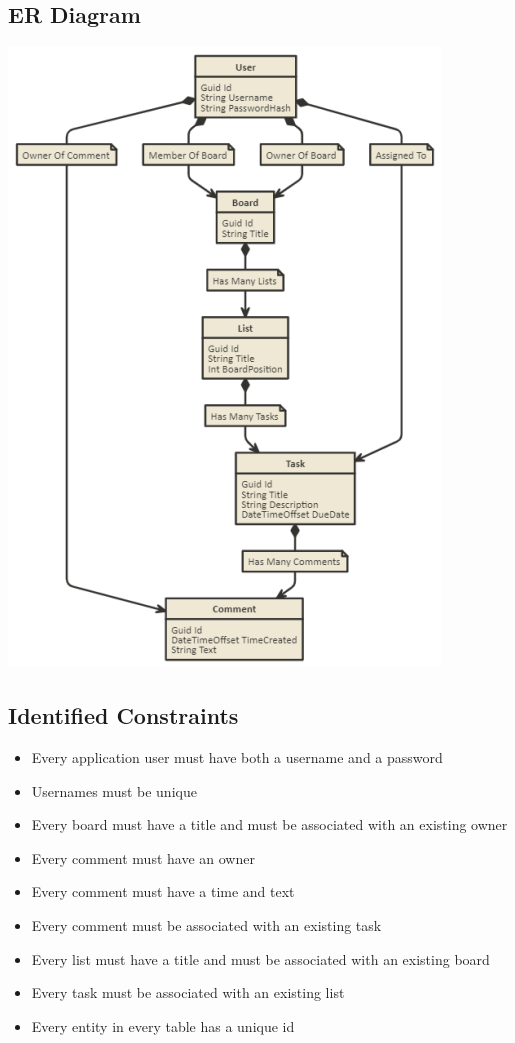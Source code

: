 \documentclass[letterpaper]{article}
\begin{document}
\subsection{ER Diagram}
\includegraphics[scale=0.75]{Images/ER}
\pagebreak

\subsection{Identified Constraints}
\begin{itemize}
  \item{Every application user must have both a username and a password}
  \item{Usernames must be unique}
  \item{Every board must have a title and must be associated with an existing owner}
  \item{Every comment must have an owner}
  \item{Every comment must have a time and text}
  \item{Every comment must be associated with an existing task}
  \item{Every list must have a title and must be associated with an existing board}
  \item{Every task must be associated with an existing list}
  \item{Every entity in every table has a unique id}
\end{itemize}
\end{document}
